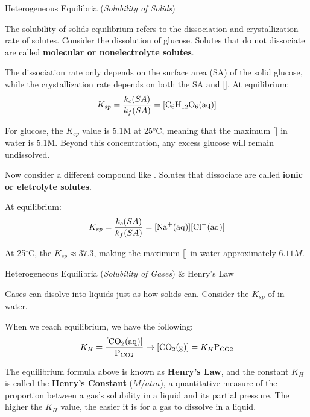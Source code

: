 \documentclass[10pt]{article}
\begin{document}
  \begin{core}{Heterogeneous Equilibria (\textit{Solubility of Solids})}
    
    The solubility of solids equilibrium refers to the dissociation and crystallization rate of solutes. Consider the dissolution of glucose. Solutes that do not dissociate are called \textbf{molecular or nonelectrolyte solutes}.




    The dissociation rate only depends on the surface area (SA) of the solid glucose, while the crystallization rate depends on both the SA and []. At equilibrium:
    \[
      K_{sp} = \frac{k_c(SA)}{k_f(SA)} = [\ce{C6H12O6(aq)}]
    \]

    For glucose, the $K_{sp}$ value is 5.1M at 25°C, meaning that the maximum [] in water is 5.1M. Beyond this concentration, any excess glucose will remain undissolved.

    Now consider a different compound like . Solutes that dissociate are called \textbf{ionic or eletrolyte solutes}.




    At equilibrium:
    \[
      K_{sp} = \frac{k_c(SA)}{k_f(SA)} = [\ce{Na^{+}(aq)}][\ce{Cl^{-}(aq)}]
    \]

    At 25$^\circ$C, the $K_{sp} \approx 37.3$, making the maximum [] in water approximately $6.11M$.

  \end{core}
  
  \begin{core}{Heterogeneous Equilibria (\textit{Solubility of Gases}) \& Henry's Law}

    Gases can disolve into liquids just as how solids can. Consider the $K_{sp}$ of  in water.


    When we reach equilibrium, we have the following:
    \[
      K_{H} = \frac{[\ce{CO2(aq)}]}{\ce{P_{CO2}}} \to [\ce{CO2(g)}] = K_{H} \ce{P_{CO2}}
    \]

    The equilibrium formula above is known as \textbf{Henry's Law}, and the constant $K_H$ is called the \textbf{Henry's Constant} ($M/atm$), a quantitative measure of the proportion between a gas's solubility in a liquid and its partial pressure. The higher the $K_H$ value, the easier it is for a gas to dissolve in a liquid.


  \end{core}  
\end{document}
